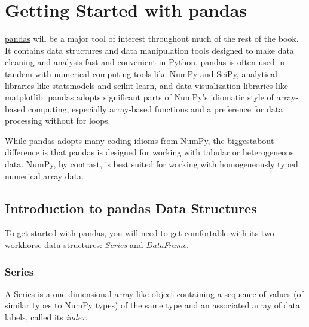 \chapter{Getting Started with pandas\label{Getting Started with pandas}}
\href{https://pandas.pydata.org/}{pandas} will be a major tool of interest throughout much of the rest of the book. It contains data structures and data manipulation tools designed to make data cleaning and analysis fast and convenient in Python. pandas is often used in tandem with numerical computing tools like NumPy and SciPy, analytical libraries like statsmodels and scikit-learn, and data visualization libraries like matplotlib. pandas adopts significant parts of NumPy's idiomatic style of array-based computing, especially
array-based functions and a preference for data processing without for loops.

While pandas adopts many coding idioms from NumPy, the biggestabout difference is that pandas is designed for working with tabular or heterogeneous data. NumPy, by contrast, is best suited for working with homogeneously typed numerical array data.

\section{Introduction to pandas Data Structures}
To get started with pandas, you will need to get comfortable with its two workhorse data structures: \emph{Series} and \emph{DataFrame}.
\subsection{Series}
A Series is a one-dimensional array-like object containing a sequence of values (of similar types to NumPy types) of the same type and an associated array of data labels, called its \emph{index}.

